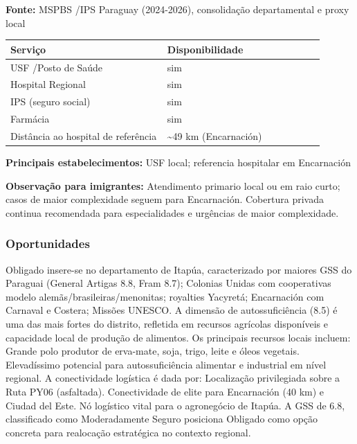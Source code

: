 \textbf{Fonte:} MSPBS /\allowbreak  IPS Paraguay (2024-2026), consolidação
departamental e proxy local

{\def\LTcaptype{none} %
\begin{longtable}{@{}>{\raggedright\arraybackslash}p{0.45\linewidth} >{\raggedright\arraybackslash}p{0.45\linewidth}@{}}
\toprule\noalign{}
Serviço & Disponibilidade \\
\midrule\noalign{}
\endhead
\bottomrule\noalign{}
\endlastfoot
USF /\allowbreak  Posto de Saúde & sim \\
Hospital Regional & sim \\
IPS (seguro social) & sim \\
Farmácia & sim \\
Distância ao hospital de referência & \textasciitilde49 km
(Encarnación) \\
\end{longtable}
}

\textbf{Principais estabelecimentos:} USF local; referencia hospitalar
em Encarnación

\textbf{Observação para imigrantes:} Atendimento primario local ou em
raio curto; casos de maior complexidade seguem para Encarnación.
Cobertura privada continua recomendada para especialidades e urgências
de maior complexidade.
\newpage

\subsubsection*{Oportunidades}\label{oport-obligado-0717}
Obligado insere-se no departamento de Itapúa, caracterizado por maiores GSS do Paraguai (General Artigas 8.8, Fram 8.7); Colonias Unidas com cooperativas modelo alemãs/brasileiras/menonitas; royalties Yacyretá; Encarnación com Carnaval e Costera; Missões UNESCO. A dimensão de autossuficiência (8.5) é uma das mais fortes do distrito, refletida em recursos agrícolas disponíveis e capacidade local de produção de alimentos. Os principais recursos locais incluem: Grande polo produtor de erva-mate, soja, trigo, leite e óleos vegetais. Elevadíssimo potencial para autossuficiência alimentar e industrial em nível regional. A conectividade logística é dada por: Localização privilegiada sobre a Ruta PY06 (asfaltada). Conectividade de elite para Encarnación (40 km) e Ciudad del Este. Nó logístico vital para o agronegócio de Itapúa. A GSS de 6.8, classificado como Moderadamente Seguro posiciona Obligado como opção concreta para realocação estratégica no contexto regional.

